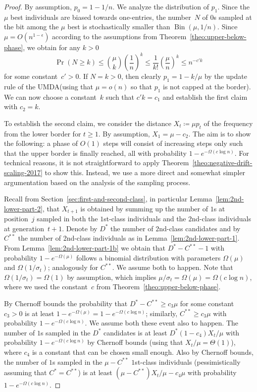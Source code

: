 \documentclass[11pt, a4paper]{article}
\newcommand{\umda}{UMDA\xspace}
\DeclareMathOperator{\Prob}{Pr}
\DeclareMathOperator{\Bin}{Bin}
\begin{document}
\begin{proof}
By assumption, $p_0=1-1/n$. We analyze the 
distribution of $p_{1}$.  
Since the $\mu$ best individuals are biased towards 
one-entries, the number~$N$ of $0$s sampled at the bit among the $\mu$ best 
is stochastically smaller than $\Bin(\mu,1/n)$. Since  $\mu=O(n^{1-\epsilon})$ according to the assumptions from
Theorem~\ref{theo:upper-below-phase}, we obtain for any $k>0$ 
\[
\Prob(N\ge k)\le \binom{\mu}{k} \left(\frac{1}{n}\right)^k \le \frac{1}{k!}\left(\frac{\mu}{n}\right)^k \le n^{-c' k}
\]
for some constant~$c'>0$. If $N=k>0$, then clearly $p_1=1-k/\mu$ by the update rule of the \umda (using that 
$\mu=o(n)$ so that $p_1$ is not capped at the border). 
We can now choose a constant~$k$ such 
that $c'k=c_1$  
and establish the first claim with $c_2=k$.   

To establish the second claim, 
we consider the distance $X_t\coloneqq \mu p_{t}$ of the frequency 
from the lower border for $t\ge 1$. By assumption, $X_1=\mu-c_2$. 
The aim is to show the following: a phase of $O(1)$ steps will consist 
of increasing steps only such that the upper border is finally reached, all 
with probability $1-e^{-\Omega(c\log n)}$.  For technical reasons, 
it is not straightforward to apply Theorem~\ref{theo:negative-drift-scaling-2017} 
to show this.
Instead, 
we use a more direct and somewhat simpler argumentation based on the analysis of the sampling process.

\newcommand{\tmu}{\tilde{\mu}}
Recall from Section~\ref{sec:first-and-second-class}, in particular Lemma~\ref{lem:2nd-lower-part-2},  
that $X_{t+1}$ is obtained by summing up 
the number of $1$s at position~$j$ 
sampled in both the $1$st-class individuals and the $2$nd-class 
individuals at generation~${t+1}$. Denote by $D^*$ the number of $2$nd-class candidates 
and by $C^{**}$ the number of 2nd-class individuals as in 
Lemma~\ref{lem:2nd-lower-part-1}. From Lemma~\ref{lem:2nd-lower-part-1b} 
we obtain that $D^*-C^{**}-1$ with probability $1-e^{-\Omega(\mu)}$ follows a binomial 
distribution with parameters $\Omega(\mu)$ and $\Omega(1/\sigma_t)$; analogously for $C^{**}$. We assume both 
to happen.  Note that $\Omega(1/\sigma_t)=\Omega(1)$ by assumption, which implies 
$\mu/\sigma_t = \Omega(\mu) = \Omega(c \log n)$, where we used 
the constant~$c$ from Theorem~\ref{theo:upper-below-phase}.

By Chernoff bounds the probability that $D^*-C^{**} \ge c_3 \mu $ for some constant~$c_3>0$  
is at least $1-e^{-\Omega(\mu)} = 1-e^{-\Omega(c\log n)}$; similarly, $C^{**} \ge c_3 \mu$ with probability 
$1-e^{-\Omega(c\log n)}$. 
 We assume both these event also to happen. The number of $1$s 
sampled in the $D^*$ candidates is at least $D^* (1-c_4) X_t/\mu$ with 
probability $1-e^{-\Omega(c\log n)}$ by Chernoff bounds (using that $X_t/\mu=\Theta(1)$), where 
$c_4$ is a constant that can be chosen small enough. Also by Chernoff bounds, the number of $1$s 
sampled in the $\mu-C^{**}$ $1$st-class individuals (pessimistically assuming 
that $C^*=C^{**}$)  is at least 
$(\mu-C^{**})  X_t/\mu - c_4 \mu$ with probability $1-e^{-\Omega(c\log n)}$.


\end{proof}
\end{document}
